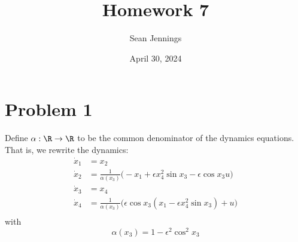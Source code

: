 \documentclass{homework}
\title{Homework 7}
\author{Sean Jennings}
\date{April 30, 2024}
\begin{document}
\maketitle

\section{Problem 1}

Define $\alpha: \R \to \R$ to be the common denominator of the dynamics equations.
That is, we rewrite the dynamics:
\begin{align*}
    \dot{x}_1 &= x_2     \\
    \dot{x}_2 &= \frac{1}{\alpha(x_3)} \biggl(
        -x_1 + \epsilon x_4^2 \sin x_3 - \epsilon \cos x_3 u
    \biggr)\\
    \dot{x}_3 &= x_4     \\
    \dot{x}_4 &= \frac{1}{\alpha(x_3)} \biggl(
        \epsilon \cos x_3 ( x_1 - \epsilon x_4^2 \sin x_3) + u
    \biggr) \\
\end{align*}
with
\begin{equation*}
    \alpha(x_3) = 1 - \epsilon^2 \cos^2 x_3
\end{equation*}
\end{document}
